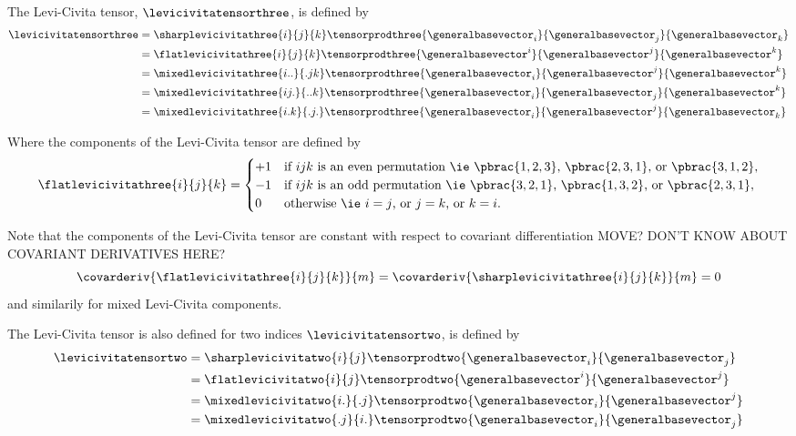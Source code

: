 The Levi-Civita tensor, $\levicivitatensorthree$, is defined by
\begin{equation}
  \begin{aligned}
    \levicivitatensorthree&=\sharplevicivitathree{i}{j}{k}\tensorprodthree{\generalbasevector_{i}}{\generalbasevector_{j}}{\generalbasevector_{k}} \\
    &=\flatlevicivitathree{i}{j}{k}\tensorprodthree{\generalbasevector^{i}}{\generalbasevector^{j}}{\generalbasevector^{k}} \\
    &=\mixedlevicivitathree{i..}{.jk}\tensorprodthree{\generalbasevector_{i}}{\generalbasevector^{j}}{\generalbasevector^{k}} \\
    &=\mixedlevicivitathree{ij.}{..k}\tensorprodthree{\generalbasevector_{i}}{\generalbasevector_{j}}{\generalbasevector^{k}} \\
    &=\mixedlevicivitathree{i.k}{.j.}\tensorprodthree{\generalbasevector_{i}}{\generalbasevector^{j}}{\generalbasevector_{k}}    
  \end{aligned}
  \label{eqn:DefinitionLeviCivitaTensorThirdOrder}
\end{equation}
\etc

Where the components of the Levi-Civita tensor are defined by
\begin{equation}
  \flatlevicivitathree{i}{j}{k}=\begin{cases}
  +1&\text{if $ijk$ is an even permutation \ie $\pbrac{1,2,3}$, $\pbrac{2,3,1}$, or $\pbrac{3,1,2}$}, \\
  -1&\text{if $ijk$ is an odd permutation \ie $\pbrac{3,2,1}$, $\pbrac{1,3,2}$, or $\pbrac{2,3,1}$}, \\
  0 &\text{otherwise \ie $i=j$, or $j=k$, or $k=i$.}
  \end{cases}
  \label{eqn:DefinitionLeviCivitaTensorComponentsThirdOrder}
\end{equation}

Note that the components of the Levi-Civita tensor are constant with respect to covariant differentiation MOVE? DON'T KNOW ABOUT COVARIANT DERIVATIVES HERE? \ie
\begin{equation}
  \covarderiv{\flatlevicivitathree{i}{j}{k}}{m}=\covarderiv{\sharplevicivitathree{i}{j}{k}}{m}=0
\end{equation}
and similarily for mixed Levi-Civita components.

The Levi-Civita tensor is also defined for two indices \ie $\levicivitatensortwo$, is defined by
\begin{equation}
  \begin{aligned}
    \levicivitatensortwo&=\sharplevicivitatwo{i}{j}\tensorprodtwo{\generalbasevector_{i}}{\generalbasevector_{j}} \\
    &=\flatlevicivitatwo{i}{j}\tensorprodtwo{\generalbasevector^{i}}{\generalbasevector^{j}} \\
    &=\mixedlevicivitatwo{i.}{.j}\tensorprodtwo{\generalbasevector_{i}}{\generalbasevector^{j}} \\
    &=\mixedlevicivitatwo{.j}{i.}\tensorprodtwo{\generalbasevector_{i}}{\generalbasevector_{j}}    
  \end{aligned}
  \label{eqn:DefinitionLeviCivitaTensorTwoOrder}
\end{equation}
\etc


